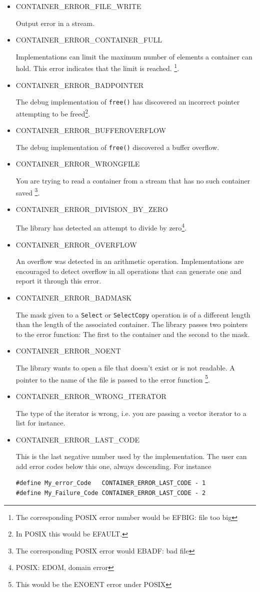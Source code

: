 \documentclass[12pt,a4paper,openany]{memoir} %
\newif\iftth
\newcommand{\doerror}[1]{%
\par\noindent
\iftth
{CONTAINER\_ERROR\_#1}
\else
{\footnotesize CONTAINER\_ERROR\_#1}
\fi
}
\begin{document}
\begin{itemize}
\doerror{FILE\_READ} Input error in a stream\footnote{The POSIX error number would be here EIO: error in input/output}.
\item
\doerror{FILE\_WRITE} Output error in a stream.
\item
\doerror{CONTAINER\_FULL} Implementations can limit the maximum number of elements a container can hold. This error indicates that the limit is reached.
\footnote{The corresponding POSIX error number would be EFBIG: file too big}.
\item
\doerror{BADPOINTER} The debug implementation of \texttt{free()} has discovered an incorrect pointer attempting to be freed\footnote{In POSIX this would be EFAULT.}.
\item
\doerror{BUFFEROVERFLOW} The debug implementation of \texttt{free()} discovered a buffer overflow.
\item
\doerror{WRONGFILE} You are trying to read a container from a stream that has no such container saved
\footnote{The corresponding POSIX error would EBADF: bad file}.
\item 
\doerror{DIVISION\_BY\_ZERO} The library has detected an attempt to divide by zero\footnote{POSIX: EDOM, domain error}.
\item
\doerror{OVERFLOW} An overflow was detected in an arithmetic operation. Implementations are encouraged to detect overflow in all operations that
can generate one and report it through this error.
\item
\doerror{BADMASK} The mask given to a \verb,Select, or \verb,SelectCopy, operation is of a different length than the length of the associated
container. The library passes two pointers to the error function: The first to the container and the second to the mask.
\item
\doerror{NOENT} The library wants to open a file that doesn't exist or is not readable. A pointer to the name of the file is passed to the error function
\footnote{This would be the ENOENT error under POSIX}.
\item
\doerror{WRONG\_ITERATOR} The type of the iterator is wrong, i.e. you are passing a vector iterator to a list for instance.
\item
\doerror{LAST\_CODE} This is the last negative number used by the implementation. The user can add error codes below this one, always descending.
For instance
\begin{verbatim}
#define My_error_Code   CONTAINER_ERROR_LAST_CODE - 1
#define My_Failure_Code CONTAINER_ERROR_LAST_CODE - 2
\end{verbatim}
\end{itemize}
\end{document}
